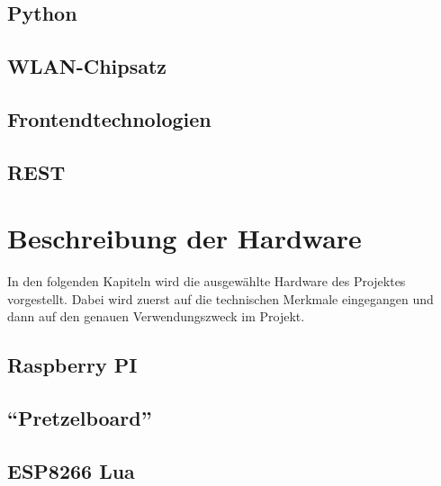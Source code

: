 \documentclass[ngerman]{scrartcl} %
\begin{document}
\subsection{Python}
\label{src:Python-1}

\subsection{WLAN-Chipsatz}
\label{sec:WLAN-CHipsatz-1} 

\subsection{Frontendtechnologien}
\label{sec:Frontendtechnologien-1}
 
 \newpage
 
\subsection{\ac{REST}}        
\label{sec:REST-1}  

\cite{Tilkov.2015}
  
\newpage
 
\section{Beschreibung der Hardware}        
\label{sec:Beschreibung der Hardware-1}  

In den folgenden Kapiteln wird die ausgewählte Hardware des Projektes vorgestellt. Dabei wird zuerst auf die technischen Merkmale eingegangen und dann auf den genauen Verwendungszweck im Projekt. 

\subsection{Raspberry PI}        
\label{sec:Raspberry PI-1} 


\newpage

\subsection{``Pretzelboard''}        
\label{sec:Pretzelboard-1} 


\newpage

\subsection{ESP8266 Lua}
\label{sec:ESP8266}
\end{document}
